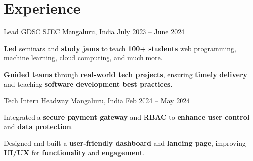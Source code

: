 \section*{Experience}

\experience
  {Lead}
  {\href{https://developers.google.com/community/gdsc}{GDSC SJEC}}
  {Mangaluru, India}
  {July 2023 -- June 2024}
  {
    \item \textbf{Led} seminars and \textbf{study jams} to teach \textbf{100+ students} web programming, machine learning, cloud computing, and much more.
    \item \textbf{Guided teams} through \textbf{real-world tech projects}, ensuring \textbf{timely delivery} and teaching \textbf{software development best practices}.
  }

\experience
  {Tech Intern}
  {\href{https://headway.co.in/}{Headway}}
  {Mangaluru, India}
  {Feb 2024 -- May 2024}
  {
    \item Integrated a \textbf{secure payment gateway} and \textbf{RBAC} to \textbf{enhance user control} and \textbf{data protection}.
    \item Designed and built a \textbf{user-friendly dashboard} and \textbf{landing page}, improving \textbf{UI/UX} for \textbf{functionality} and \textbf{engagement}.
  }
